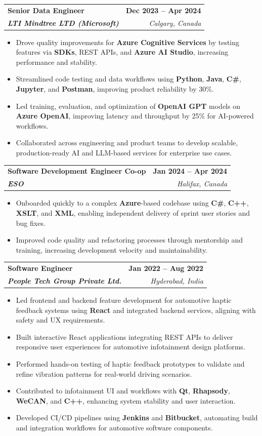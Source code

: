 \documentclass[letterpaper,11pt]{article}
\makeatletter
\newcommand{\resumeItem}[1]{
  \item\small{
    {#1 \vspace{-2pt}}
  }
}
\newcommand{\resumeSubheading}[4]{
  \vspace{-2pt}\item
    \begin{tabular*}{1.0\textwidth}[t]{l@{\extracolsep{\fill}}r}
      \textbf{#1} & \textbf{\small #2} \\
      \textit{\small#3} & \textit{\small #4} \\
    \end{tabular*}\vspace{-7pt}
}
\newcommand{\resumeItemListStart}{\begin{itemize}}
\newcommand{\resumeItemListEnd}{\end{itemize}\vspace{-5pt}}
\makeatother
\begin{document}
    \resumeSubheading
      {\textbf{Senior Data Engineer}}{\textbf{Dec 2023 -- Apr 2024}}
      {\textbf{LTI Mindtree LTD (Microsoft)}}{Calgary, Canada}
      \resumeItemListStart
        \resumeItem{Drove quality improvements for \textbf{Azure Cognitive Services} by testing features via \textbf{SDKs}, REST APIs, and \textbf{Azure AI Studio}, increasing performance and stability.}
        \resumeItem{Streamlined code testing and data workflows using \textbf{Python}, \textbf{Java}, \textbf{C\#}, \textbf{Jupyter}, and \textbf{Postman}, improving product reliability by 30\%.}
        \resumeItem{Led training, evaluation, and optimization of \textbf{OpenAI GPT} models on \textbf{Azure OpenAI}, improving latency and throughput by 25\% for AI-powered workflows.}
        \resumeItem{Collaborated across engineering and product teams to develop scalable, production-ready AI and LLM-based services for enterprise use cases.}
      \resumeItemListEnd
    
    \resumeSubheading
      {\textbf{Software Development Engineer Co-op}}{\textbf{Jan 2024 -- Apr 2024}}
      {\textbf{ESO}}{Halifax, Canada}
      \resumeItemListStart
        \resumeItem{Onboarded quickly to a complex \textbf{Azure}-based codebase using \textbf{C\#}, \textbf{C++}, \textbf{XSLT}, and \textbf{XML}, enabling independent delivery of sprint user stories and bug fixes.}
        \resumeItem{Improved code quality and refactoring processes through mentorship and training, increasing development velocity and maintainability.}
      \resumeItemListEnd

    \resumeSubheading
      {\textbf{Software Engineer}}{\textbf{Jan 2022 -- Aug 2022}}
      {\textbf{People Tech Group Private Ltd.}}{Hyderabad, India}
      \resumeItemListStart
        \resumeItem{Led frontend and backend feature development for automotive haptic feedback systems using \textbf{React} and integrated backend services, aligning with safety and UX requirements.}
        \resumeItem{Built interactive React applications integrating REST APIs to deliver responsive user experiences for automotive infotainment design platforms.}
        \resumeItem{Performed hands-on testing of haptic feedback prototypes to validate and refine vibration patterns for real-world driving scenarios.}
        \resumeItem{Contributed to infotainment UI and workflows with \textbf{Qt}, \textbf{Rhapsody}, \textbf{WeCAN}, and \textbf{C++}, enhancing system stability and user interaction.}
        \resumeItem{Developed CI/CD pipelines using \textbf{Jenkins} and \textbf{Bitbucket}, automating build and integration workflows for automotive software components.}
      \resumeItemListEnd
\end{document}

